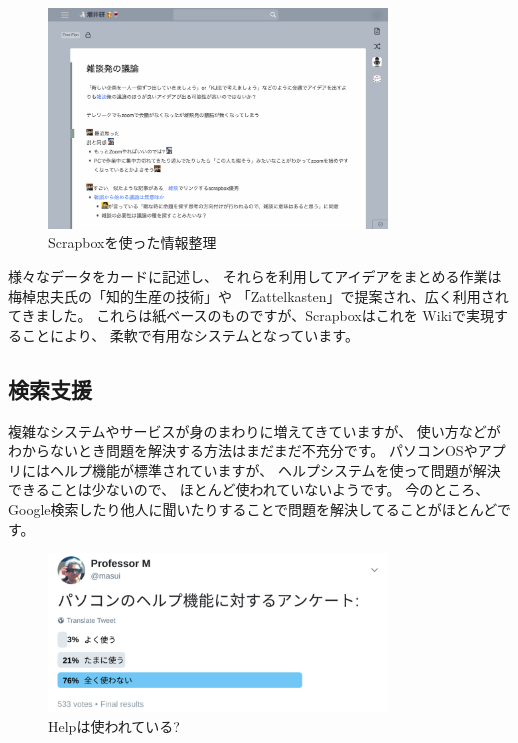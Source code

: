 \documentclass[topics]{compsoft} %
\begin{document}
\begin{figure}[t]
  \includegraphics[width=9cm,bb=0 0 2235 1452]{figures/cca2e0eaed298ea4952a26d2effa238c.png}
  \caption{Scrapboxを使った情報整理}
  \label{example1}
\end{figure}

様々なデータをカードに記述し、
それらを利用してアイデアをまとめる作業は
梅棹忠夫氏の「知的生産の技術」や
「Zattelkasten」で提案され、広く利用されてきました。
これらは紙ベースのものですが、Scrapboxはこれを
Wikiで実現することにより、
柔軟で有用なシステムとなっています。


\subsection{検索支援}

複雑なシステムやサービスが身のまわりに増えてきていますが、
使い方などがわからないとき問題を解決する方法はまだまだ不充分です。
パソコンOSやアプリにはヘルプ機能が標準されていますが、
ヘルプシステムを使って問題が解決できることは少ないので、
ほとんど使われていないようです。
今のところ、Google検索したり他人に聞いたりすることで問題を解決してることがほとんどです。

\begin{figure}[t]
  \includegraphics[width=9cm,bb=0 0 1332 623]{figures/383ee54c265ebbb88778d7ea0fbea5b1.png}
  \caption{Helpは使われている?}
  \label{example1}
\end{figure}

\end{document}
